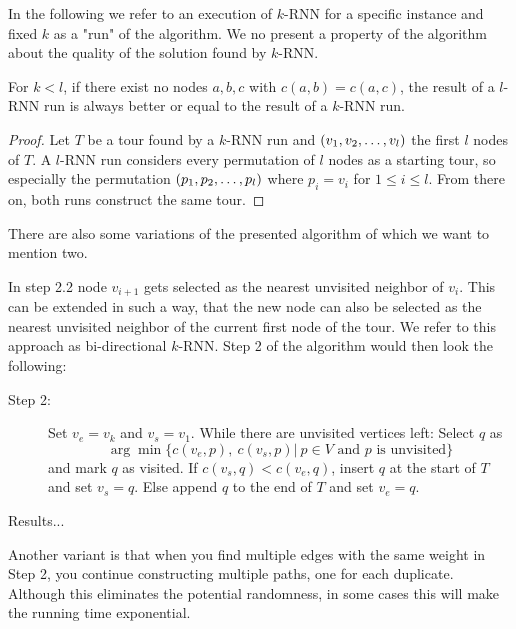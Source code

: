 In the following we refer to an execution of $k$-RNN for a specific instance and fixed $k$ as a "run" of the algorithm.
We no present a property of the algorithm about the quality of the solution found by $k$-RNN.
\begin{theorem}
	For $k < l$, if there exist no nodes $a, b, c$ with $c(a, b) = c(a, c)$, the result of a $l$-RNN run is always better or equal to the result of a $k$-RNN run.
\end{theorem}
\begin{proof}
	Let $T$ be a tour found by a $k$-RNN run and $(v_1, v_2, \mathellipsis, v_l)$ the first $l$ nodes of $T$. 
	A $l$-RNN run considers every permutation of $l$ nodes as a starting tour, so especially the permutation $(p_1, p_2, \mathellipsis, p_l)$ where $p_i = v_i$ for $1 \leq i \leq l$. 
	From there on, both runs construct the same tour.
\end{proof}

There are also some variations of the presented algorithm of which we want to mention two.

In step 2.2 node $v_{i+1}$ gets selected as the nearest unvisited neighbor of $v_i$. This can be extended in such a way, that the new node can also be selected as the nearest unvisited neighbor of the current first node of the tour. 
We refer to this approach as bi-directional $k$-RNN. Step 2 of the algorithm would then look the following:

\begin{description}
	\item[Step 2:] Set $v_e = v_k$ and $v_s = v_1$. 
	While there are unvisited vertices left: 
	Select $q$ as 
	\[
	\arg \min\{c(v_e, p),\ c(v_s, p) |\ p \in V \text{ and $p$ is unvisited}\}
	\] 
	and mark $q$ as visited. If $c(v_s, q) < c (v_e, q)$, insert $q$ at the start of $T$ and set $v_s = q$. Else append $q$ to the end of $T$ and set $v_e = q$.
\end{description}

Results...

Another variant is that when you find multiple edges with the same weight in Step 2, you continue constructing multiple paths, one for each duplicate. 
Although this eliminates the potential randomness, in some cases this will make the running time exponential.

